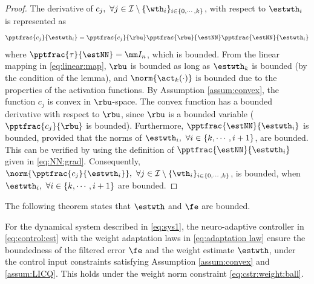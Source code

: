 \documentclass[journal]{IEEEtran}
\begin{document}
\begin{proof}

The derivative of $c_j,\ \forall j\in\mathcal I \setminus \{\wth_i\}_{i\in\{0,\cdots,k\}}$, with respect to $\estwth_i$ is represented as
\begin{equation}
    \pptfrac{c_j}{\estwth_i} 
    = 
    \pptfrac{c_j}{\rbu} 
    \pptfrac{\rbu}{\estNN} 
    \pptfrac{\estNN}{\estwth_i}
\end{equation}
where $\pptfrac{\tau}{\estNN}=\mm I_n$, which is bounded. 
From the linear mapping in \eqref{eq:linear:map}, $\rbu$ is bounded as long as $\estwth_k$ is bounded (by the condition of the lemma), and $\norm{\act_k(\cdot)}$ is bounded due to the properties of the activation functions. 
By Assumption \ref{assum:convex}, the function $c_j$ is convex in $\rbu$-space.
The convex function has a bounded derivative with respect to $\rbu$, since $\rbu$ is a bounded variable (\ie $\pptfrac{c_j}{\rbu}$ is bounded). 
Furthermore, $\pptfrac{\estNN}{\estwth_i}$ is bounded, provided that the norms of $\estwth_i,\ \forall i \in\{k,\cdots,i+1\}$, are bounded. 
This can be verified by using the definition of $\pptfrac{\estNN}{\estwth_i}$ given in \eqref{eq:NN:grad}.
Consequently, $\norm{\pptfrac{c_j}{\estwth_i}},\ \forall j\in\mathcal I \setminus \{\wth_i\}_{i\in\{0,\cdots,k\}}$, is bounded, when $\estwth_i,\ \forall i\in \{k,\cdots,i+1\}$ are bounded.

\end{proof}

The following theorem states that $\estwth$ and $\fe$ are bounded.

\begin{theorem}
    For the dynamical system described in \eqref{eq:sys1}, the neuro-adaptive controller in \eqref{eq:control:est} with the weight adaptation laws in \eqref{eq:adaptation law} ensure the boundedness of the filtered error $\fe$ and the weight estimate $\estwth$, under the control input constraints satisfying Assumption \ref{assum:convex} and \ref{assum:LICQ}.
    This holds under the weight norm constraint \eqref{eq:cstr:weight:ball}.
\end{theorem}
\end{document}
